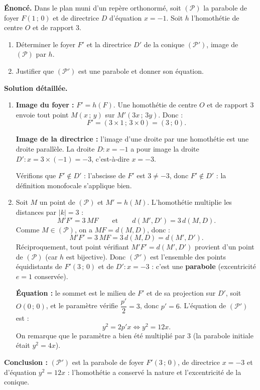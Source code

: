 \documentclass[11pt]{article}
\begin{document}
\begin{exoresolu}
\textbf{Énoncé.} Dans le plan muni d'un repère orthonormé, soit $(\mathcal{P})$ la parabole de foyer $F(1\,;\,0)$ et de directrice $D$ d'équation $x = -1$. Soit $h$ l'homothétie de centre $O$ et de rapport $3$.
\begin{enumerate}
\item Déterminer le foyer $F'$ et la directrice $D'$ de la conique $(\mathcal{P}')$, image de $(\mathcal{P})$ par $h$.
\item Justifier que $(\mathcal{P}')$ est une parabole et donner son équation.
\end{enumerate}
\tcblower
\textbf{Solution détaillée.}
\begin{enumerate}
\item \textbf{Image du foyer :} $F' = h(F)$. Une homothétie de centre $O$ et de rapport $3$ envoie tout point $M(x\,;\,y)$ sur $M'(3x\,;\,3y)$. Donc :
\[ F' = (3 \times 1\,;\, 3 \times 0) = (3\,;\,0). \]

\textbf{Image de la directrice :} l'image d'une droite par une homothétie est une droite parallèle. La droite $D : x = -1$ a pour image la droite $D' : x = 3 \times (-1) = -3$, c'est-à-dire $x = -3$.

Vérifions que $F' \notin D'$ : l'abscisse de $F'$ est $3 \neq -3$, donc $F' \notin D'$ : la définition monofocale s'applique bien.

\item Soit $M$ un point de $(\mathcal{P})$ et $M' = h(M)$. L'homothétie multiplie les distances par $|k| = 3$ :
\[ M'F' = 3\, MF \qquad \text{et} \qquad d(M', D') = 3\, d(M, D). \]
Comme $M \in (\mathcal{P})$, on a $MF = d(M, D)$, donc :
\[ M'F' = 3\, MF = 3\, d(M, D) = d(M', D'). \]
Réciproquement, tout point vérifiant $M'F' = d(M', D')$ provient d'un point de $(\mathcal{P})$ (car $h$ est bijective). Donc $(\mathcal{P}')$ est l'ensemble des points équidistants de $F'(3\,;\,0)$ et de $D' : x = -3$ : c'est une \textbf{parabole} (excentricité $e = 1$ conservée).

\textbf{Équation :} le sommet est le milieu de $F'$ et de sa projection sur $D'$, soit $O(0\,;\,0)$, et le paramètre vérifie $\dfrac{p'}{2} = 3$, donc $p' = 6$. L'équation de $(\mathcal{P}')$ est :
\[ y^2 = 2p' x \iff \boxed{y^2 = 12x}. \]
On remarque que le paramètre a bien été multiplié par $3$ (la parabole initiale était $y^2 = 4x$).
\end{enumerate}
\textbf{Conclusion :} $(\mathcal{P}')$ est la parabole de foyer $F'(3\,;\,0)$, de directrice $x = -3$ et d'équation $y^2 = 12x$ : l'homothétie a conservé la nature et l'excentricité de la conique.
\end{exoresolu}
\end{document}
